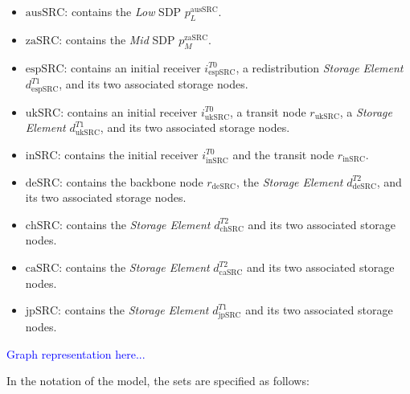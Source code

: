 \documentclass[a4paper,fleqn]{cas-dc}
\begin{document}
\begin{itemize} 
\item \(\mathrm{ausSRC}\): contains the \emph{Low} SDP \(p_L^{\mathrm{ausSRC}}\). 

\item \(\mathrm{zaSRC}\): contains the \emph{Mid} SDP \(p_M^{\mathrm{zaSRC}}\). 

\item \(\mathrm{espSRC}\): contains an initial receiver \(i_{\mathrm{espSRC}}^{T0}\), a redistribution \emph{Storage Element} \(d_{\mathrm{espSRC}}^{T1}\), and its two associated storage nodes. 

\item \(\mathrm{ukSRC}\): contains an initial receiver \(i_{\mathrm{ukSRC}}^{T0}\), a transit node \(r_{\mathrm{ukSRC}}\), a \emph{Storage Element} \(d_{\mathrm{ukSRC}}^{T1}\), and its two associated storage nodes. 

\item \(\mathrm{inSRC}\): contains the initial receiver \(i_{\mathrm{inSRC}}^{T0}\) and the transit node \(r_{\mathrm{inSRC}}\). 

\item \(\mathrm{deSRC}\): contains the backbone node \(r_{\mathrm{deSRC}}\), the \emph{Storage Element} \(d_{\mathrm{deSRC}}^{T2}\), and its two associated storage nodes. 

\item \(\mathrm{chSRC}\): contains the \emph{Storage Element} \(d_{\mathrm{chSRC}}^{T2}\) and its two associated storage nodes. 

\item \(\mathrm{caSRC}\): contains the \emph{Storage Element} \(d_{\mathrm{caSRC}}^{T2}\) and its two associated storage nodes. 

\item \(\mathrm{jpSRC}\): contains the \emph{Storage Element} \(d_{\mathrm{jpSRC}}^{T1}\) and its two associated storage nodes. 

\end{itemize}


\textcolor{blue}{Graph representation here...}

In the notation of the model, the sets are specified as follows:
\end{document}
